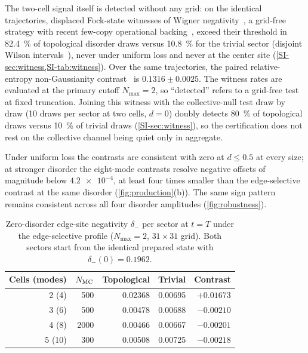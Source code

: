 \documentclass[aps,pra,preprint,superscriptaddress,amsmath,amssymb]{revtex4-2}
\begin{document}
The two-cell signal itself is detected without any grid: on the identical trajectories, displaced Fock-state witnesses of Wigner negativity~\cite{Chabaud2021witnessingwigner}, a grid-free strategy with recent few-copy operational backing~\cite{Chakrabarty2026}, exceed their threshold in \qty{82.4}{\percent} of topological disorder draws versus \qty{10.8}{\percent} for the trivial sector (disjoint Wilson intervals~\cite{Wilson1927}), never under uniform loss and never at the center site (\cref{SI-sec:witness,SI-tab:witness}). Over the same trajectories, the paired relative-entropy non-Gaussianity contrast~\cite{Albarelli2018} is $\num{0.1316}\pm\num{0.0025}$. The witness rates are evaluated at the primary cutoff $N_{\max}=\num{2}$, so ``detected'' refers to a grid-free test at fixed truncation. Joining this witness with the collective-null test draw by draw (\num{10} draws per sector at two cells, $d=\num{0}$) doubly detects \qty{80}{\percent} of topological draws versus \qty{10}{\percent} of trivial draws (\cref{SI-sec:witness}), so the certification does not rest on the collective channel being quiet only in aggregate.

Under uniform loss the contrasts are consistent with zero at $d\le\num{0.5}$ at every size; at stronger disorder the eight-mode contrasts resolve negative offsets of magnitude below $\num{4.2e-4}$, at least four times smaller than the edge-selective contrast at the same disorder (\cref{fig:production}(b)). The same sign pattern remains consistent across all four disorder amplitudes (\cref{fig:robustness}).

\begin{table}[htpb]
  \centering
  \caption{Zero-disorder edge-site negativity $\delta_-$ per sector at $t=T$ under the edge-selective profile ($N_{\max}=\num{2}$, $\num{31}\times\num{31}$ grid). Both sectors start from the identical prepared state with $\delta_-(\num{0})=\num{0.1962}$.}
  \label{tab:sectornegativity}
  \begin{ruledtabular}
  \begin{tabular}{rrrrr}
  Cells (modes) & $N_{\rm MC}$ & Topological & Trivial & Contrast \\
  \hline
  \num{2} (\num{4})  & \num{500}  & \num{0.02368} & \num{0.00695} & $+\num{0.01673}$ \\
  \num{3} (\num{6})  & \num{500}  & \num{0.00478} & \num{0.00688} & $-\num{0.00210}$ \\
  \num{4} (\num{8})  & \num{2000} & \num{0.00466} & \num{0.00667} & $-\num{0.00201}$ \\
  \num{5} (\num{10}) & \num{300}  & \num{0.00508} & \num{0.00725} & $-\num{0.00218}$ \\
  \end{tabular}
  \end{ruledtabular}
\end{table}
\end{document}
